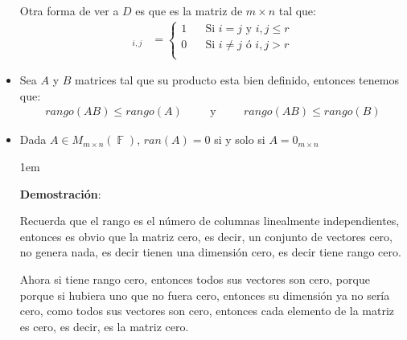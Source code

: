 \documentclass[12pt, fleqn]{report}                             %
\newenvironment{SmallIndentation}[1][0.75em]                    %
        {\begin{adjustwidth}{#1}{}\begin{footnotesize}}             %
        {\end{footnotesize}\end{adjustwidth}}                       %
\DeclareMathOperator \Space     {\quad}                         %
\DeclareMathOperator \MiniSpace {\;}                            %
\newcommand \Also           {\MiniSpace \text{y} \MiniSpace}    %
\theoremstyle{break}                                            %
\DeclareMathOperator \GenericField {\mathbb{F}}                 %
\begin{document}
\begin{itemize}
                        Otra forma de ver a $D$ es que es la matriz de $m \times n$
                        tal que:
                        \begin{align*}
                            [D]_{i, j}
                                &= 
                                \begin{cases}
                                    1 \Space \text{Si $i = j$ y $i, j \leq r$}   \\
                                    0 \Space \text{Si $i \neq j$ ó $i, j > r$}   \\
                                \end{cases}
                        \end{align*}

                    \clearpage

                    \item
                        Sea $A$ y $B$ matrices tal que su producto esta bien definido,
                        entonces tenemos que:
                        \begin{align*}
                            rango(AB) \leq rango(A)
                            \Space
                            \Also
                            \Space
                            rango(AB) \leq rango(B)
                        \end{align*}

                    \item
                        Dada $A \in M_{m \times n}(\GenericField)$, $ran(A) = 0$ si y solo si $A = 0_{m \times n}$

                        \begin{SmallIndentation}[1em]
                            \textbf{Demostración}:
                            
                            Recuerda que el rango es el número de columnas linealmente independientes, entonces
                            es obvio que la matriz cero, es decir, un conjunto de vectores cero, no genera nada, es decir
                            tienen una dimensión cero, es decir tiene rango cero.

                            Ahora si tiene rango cero, entonces todos sus vectores son cero, porque porque si hubiera uno que no
                            fuera cero, entonces su dimensión ya no sería cero, como todos sus vectores son cero, entonces
                            cada elemento de la matriz es cero, es decir, es la matriz cero.
                        
                        \end{SmallIndentation}

                \end{itemize}
\end{document}
